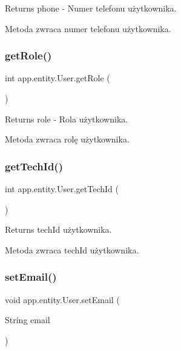 \begin{DoxyReturn}{Returns}
phone -\/ Numer telefonu użytkownika.
\end{DoxyReturn}
Metoda zwraca numer telefonu użytkownika. \mbox{\label{classapp_1_1entity_1_1_user_a4721353539977173bf6aaaabfcd536ed}} 
\subsubsection{\texorpdfstring{getRole()}{getRole()}}
{\footnotesize\ttfamily int app.\+entity.\+User.\+get\+Role (\begin{DoxyParamCaption}{ }\end{DoxyParamCaption})}

\begin{DoxyReturn}{Returns}
role -\/ Rola użytkownika.
\end{DoxyReturn}
Metoda zwraca rolę użytkownika. \mbox{\label{classapp_1_1entity_1_1_user_a02c8353d6858b839770ddcb0d1bb421a}} 
\subsubsection{\texorpdfstring{getTechId()}{getTechId()}}
{\footnotesize\ttfamily int app.\+entity.\+User.\+get\+Tech\+Id (\begin{DoxyParamCaption}{ }\end{DoxyParamCaption})}

\begin{DoxyReturn}{Returns}
tech\+Id użytkownika.
\end{DoxyReturn}
Metoda zwraca tech\+Id użytkownika. \mbox{\label{classapp_1_1entity_1_1_user_ad3c508983e8cf0ecbb5fa8158671945c}} 
\subsubsection{\texorpdfstring{setEmail()}{setEmail()}}
{\footnotesize\ttfamily void app.\+entity.\+User.\+set\+Email (\begin{DoxyParamCaption}\item[{String}]{email }\end{DoxyParamCaption})}


